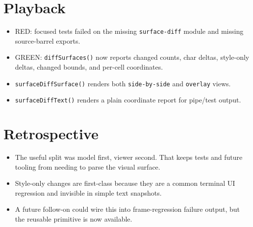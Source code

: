 \section{Playback}\label{record-124-playback}

\begin{itemize}
\tightlist
\item
  RED: focused tests failed on the missing \texttt{s\allowbreak{}u\allowbreak{}r\allowbreak{}f\allowbreak{}a\allowbreak{}c\allowbreak{}e\allowbreak{}-\allowbreak{}d\allowbreak{}i\allowbreak{}f\allowbreak{}f} module and missing source-barrel exports.
\item
  GREEN: \texttt{d\allowbreak{}i\allowbreak{}f\allowbreak{}f\allowbreak{}S\allowbreak{}u\allowbreak{}r\allowbreak{}f\allowbreak{}a\allowbreak{}c\allowbreak{}e\allowbreak{}s\allowbreak{}(\allowbreak{})} now reports changed counts, char deltas, style-only deltas, changed bounds, and per-cell coordinates.
\item
  \texttt{s\allowbreak{}u\allowbreak{}r\allowbreak{}f\allowbreak{}a\allowbreak{}c\allowbreak{}e\allowbreak{}D\allowbreak{}i\allowbreak{}f\allowbreak{}f\allowbreak{}S\allowbreak{}u\allowbreak{}r\allowbreak{}f\allowbreak{}a\allowbreak{}c\allowbreak{}e\allowbreak{}(\allowbreak{})} renders both \texttt{s\allowbreak{}i\allowbreak{}d\allowbreak{}e\allowbreak{}-\allowbreak{}b\allowbreak{}y\allowbreak{}-\allowbreak{}s\allowbreak{}i\allowbreak{}d\allowbreak{}e} and \texttt{o\allowbreak{}v\allowbreak{}e\allowbreak{}r\allowbreak{}l\allowbreak{}a\allowbreak{}y} views.
\item
  \texttt{s\allowbreak{}u\allowbreak{}r\allowbreak{}f\allowbreak{}a\allowbreak{}c\allowbreak{}e\allowbreak{}D\allowbreak{}i\allowbreak{}f\allowbreak{}f\allowbreak{}T\allowbreak{}e\allowbreak{}x\allowbreak{}t\allowbreak{}(\allowbreak{})} renders a plain coordinate report for pipe/test output.
\end{itemize}

\section{Retrospective}\label{record-124-retrospective}

\begin{itemize}
\tightlist
\item
  The useful split was model first, viewer second. That keeps tests and future tooling from needing to parse the visual surface.
\item
  Style-only changes are first-class because they are a common terminal UI regression and invisible in simple text snapshots.
\item
  A future follow-on could wire this into frame-regression failure output, but the reusable primitive is now available.
\end{itemize}

